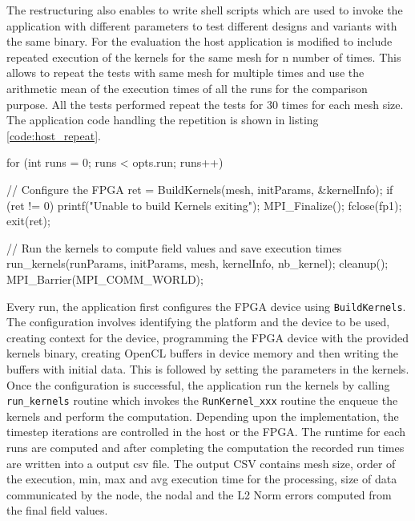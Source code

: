 The restructuring also enables to write shell scripts which are
used to invoke the application with different parameters to test different
designs and variants with the same binary. For the evaluation the host
application is modified to include repeated execution of the kernels for the
same mesh for n number of times. This allows to repeat the tests with
same mesh for multiple times and use the arithmetic mean of the execution times
of all the runs for the comparison purpose. All the tests performed repeat
the tests for 30 times for each mesh size. The application code handling
the repetition is shown in listing \ref{code:host_repeat}.
\begin{CppCode}[caption=Test repetion implementation in the host code, frame=tlrb, label=code:host_repeat]
for (int runs = 0; runs < opts.run; runs++)
{
    // Configure the FPGA
    ret = BuildKernels(mesh, initParams, &kernelInfo);
    if (ret != 0)
    {
      printf("Unable to build Kernels exiting\n");
      MPI_Finalize();
      fclose(fp1);
      exit(ret);
    }

    // Run the kernels to compute field values and save execution times
    run_kernels(runParams, initParams, mesh, kernelInfo, nb_kernel);
    cleanup();
    MPI_Barrier(MPI_COMM_WORLD);
}
\end{CppCode}
Every run, the application first configures the FPGA device using \texttt{BuildKernels}.
The configuration involves identifying the platform and the device to be used, creating
context for the device, programming the FPGA device with the provided kernels binary,
creating OpenCL buffers in device memory and then writing the buffers with initial data.
This is followed by setting the parameters in the kernels. Once the configuration is successful,
the application run the kernels by calling \texttt{run\_kernels} routine which invokes the
\texttt{RunKernel\_xxx} routine the enqueue the kernels and perform the computation. Depending
upon the implementation, the timestep iterations are controlled in the host or the FPGA.
The runtime for each runs are computed and after completing the computation the recorded
run times are written into a output csv file. The output CSV contains mesh size,
order of the execution, min, max and avg execution time for the processing, size
of data communicated by the node, the nodal and the L2 Norm errors computed from the
final field values.


